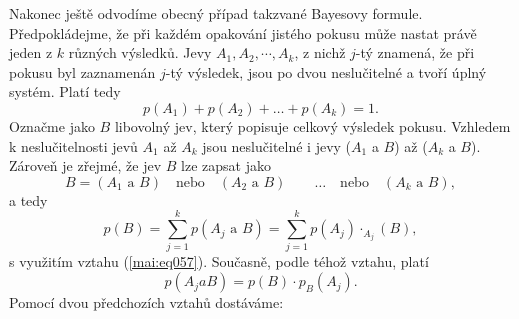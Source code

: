       
      
      
      
      Nakonec ještě odvodíme obecný případ takzvané Bayesovy formule. Předpokládejme, že při
      každém opakování jistého pokusu může nastat právě jeden z \(k\) různých výsledků. Jevy \(A_1,
      A_2,\cdots, A_k\), z nichž \(j\)-tý znamená, že při pokusu byl zaznamenán \(j\)-tý výsledek, 
      jsou po dvou neslučitelné a tvoří úplný systém. Platí tedy
      \begin{equation*}
        p(A_1) + p(A_2) + \ldots  + p(A_k) = 1.
      \end{equation*}
      Označme jako \(B\) libovolný jev, který popisuje celkový výsledek pokusu. Vzhledem k 
      neslučitelnosti jevů \(A_1\) až \(A_k\) jsou neslučitelné i jevy (\(A_1\) a \(B\)) až 
      (\(A_k\) a \(B\)). Zároveň je zřejmé, že jev \(B\) lze zapsat jako
     \begin{equation*}
       B = (A_1\text{ a }B) \quad\text{nebo}\quad (A_2\text{ a }B) \qquad\ldots
       \quad\text{nebo}\quad (A_k\text{ a }B),
     \end{equation*} 
      a tedy
      \begin{equation*}
        p(B) = \sum_{j=1}^{k}p(A_j\text{ a }B) = \sum_{j=1}^{k}p(A_j)\cdotp_{A_j}(B),
      \end{equation*}
      s využitím vztahu (\ref{mai:eq057}). Současně, podle téhož vztahu, platí 
      \begin{equation*}
        p(A_j a B) = p(B)\cdot  p_B(A_j).
      \end{equation*}
      Pomocí dvou předchozích vztahů dostáváme:
      
      
